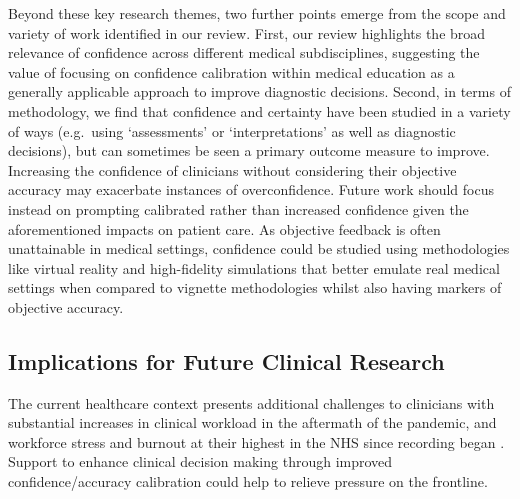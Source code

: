 \documentclass[a4paper, nobind]{templates/ociamthesis}
\begin{document}
\hfill\break
Beyond these key research themes, two further points emerge from the scope and variety of work identified in our review. First, our review highlights the broad relevance of confidence across different medical subdisciplines, suggesting the value of focusing on confidence calibration within medical education as a generally applicable approach to improve diagnostic decisions. Second, in terms of methodology, we find that confidence and certainty have been studied in a variety of ways (e.g.~using `assessments' or `interpretations' as well as diagnostic decisions), but can sometimes be seen a primary outcome measure to improve. Increasing the confidence of clinicians without considering their objective accuracy may exacerbate instances of overconfidence. Future work should focus instead on prompting calibrated rather than increased confidence given the aforementioned impacts on patient care. As objective feedback is often unattainable in medical settings, confidence could be studied using methodologies like virtual reality and high-fidelity simulations that better emulate real medical settings when compared to vignette methodologies whilst also having markers of objective accuracy.

\subsection*{Implications for Future Clinical Research}\label{implications-for-future-clinical-research}

The current healthcare context presents additional challenges to clinicians with substantial increases in clinical workload in the aftermath of the pandemic, and workforce stress and burnout at their highest in the NHS since recording began \autocite{noauthor_state_2024}. Support to enhance clinical decision making through improved confidence/accuracy calibration could help to relieve pressure on the frontline.
\end{document}

